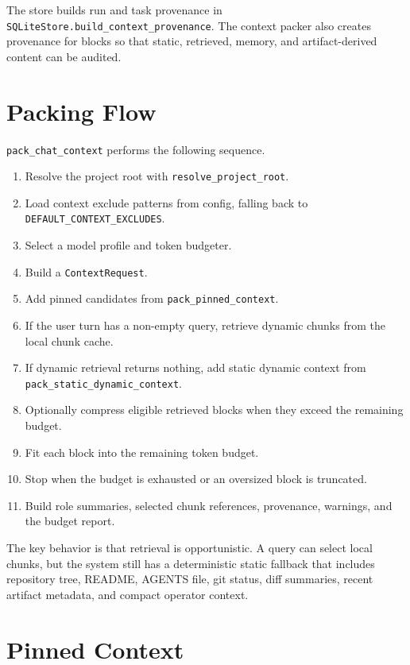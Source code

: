 \documentclass[11pt]{article}
\begin{document}
The store builds run and task provenance in \texttt{SQLiteStore.build\_context\_provenance}. The context packer also creates provenance for blocks so that static, retrieved, memory, and artifact-derived content can be audited.

\section{Packing Flow}

\texttt{pack\_chat\_context} performs the following sequence.

\begin{enumerate}[leftmargin=*]
  \item Resolve the project root with \texttt{resolve\_project\_root}.
  \item Load context exclude patterns from config, falling back to \texttt{DEFAULT\_CONTEXT\_EXCLUDES}.
  \item Select a model profile and token budgeter.
  \item Build a \texttt{ContextRequest}.
  \item Add pinned candidates from \texttt{pack\_pinned\_context}.
  \item If the user turn has a non-empty query, retrieve dynamic chunks from the local chunk cache.
  \item If dynamic retrieval returns nothing, add static dynamic context from \texttt{pack\_static\_dynamic\_context}.
  \item Optionally compress eligible retrieved blocks when they exceed the remaining budget.
  \item Fit each block into the remaining token budget.
  \item Stop when the budget is exhausted or an oversized block is truncated.
  \item Build role summaries, selected chunk references, provenance, warnings, and the budget report.
\end{enumerate}

The key behavior is that retrieval is opportunistic. A query can select local chunks, but the system still has a deterministic static fallback that includes repository tree, README, AGENTS file, git status, diff summaries, recent artifact metadata, and compact operator context.

\section{Pinned Context}
\end{document}
